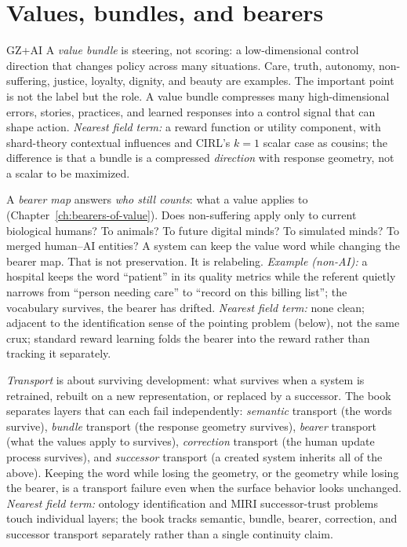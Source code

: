 \section*{Values, bundles, and bearers}
\begin{authbar}{GZ+AI}
A \emph{value bundle} is steering, not scoring: a low-dimensional control direction that changes policy across many situations.
Care, truth, autonomy, non-suffering, justice, loyalty, dignity, and beauty are examples.
The important point is not the label but the role.
A value bundle compresses many high-dimensional errors, stories, practices, and learned responses into a control signal that can shape action.
\emph{Nearest field term:} a reward function or utility component, with shard-theory contextual influences and CIRL's \(k=1\) scalar case as cousins; the difference is that a bundle is a compressed \emph{direction} with response geometry, not a scalar to be maximized.

A \emph{bearer map} answers \emph{who still counts}: what a value applies to (Chapter~\ref{ch:bearers-of-value}).
Does non-suffering apply only to current biological humans?
To animals?
To future digital minds?
To simulated minds?
To merged human--AI entities?
A system can keep the value word while changing the bearer map.
That is not preservation.
It is relabeling.
\emph{Example (non-AI):} a hospital keeps the word ``patient'' in its quality metrics while the referent quietly narrows from ``person needing care'' to ``record on this billing list''; the vocabulary survives, the bearer has drifted.
\emph{Nearest field term:} none clean; adjacent to the identification sense of the pointing problem (below), not the same crux; standard reward learning folds the bearer into the reward rather than tracking it separately.

\emph{Transport} is about surviving development: what survives when a system is retrained, rebuilt on a new representation, or replaced by a successor.
The book separates layers that can each fail independently: \emph{semantic} transport (the words survive), \emph{bundle} transport (the response geometry survives), \emph{bearer} transport (what the values apply to survives), \emph{correction} transport (the human update process survives), and \emph{successor} transport (a created system inherits all of the above).
Keeping the word while losing the geometry, or the geometry while losing the bearer, is a transport failure even when the surface behavior looks unchanged.
\emph{Nearest field term:} ontology identification and MIRI successor-trust problems touch individual layers; the book tracks semantic, bundle, bearer, correction, and successor transport separately rather than a single continuity claim.


\end{authbar}
